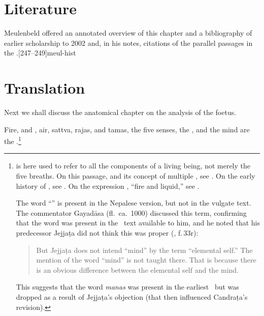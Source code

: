 \section{Literature} 

Meulenbeld offered an annotated overview of this chapter and a
bibliography of earlier scholarship to 2002 and, in his notes, citations
of the parallel passages in the \CS.[247--249]{meul-hist}   

\newpage

\section{Translation}

\begin{translation}

  
\bigskip       

\item[1]

Next we shall discuss the anatomical chapter on the analysis of the foetus.
 
\item[3]

\newenvironment{tightquote}
    {\list{}{\listparindent 1.5em%
          \itemindent    \listparindent
          \rightmargin   \leftmargin
          \parsep        \z@ \@plus\p@}%
      \item\relax}
  {\endlist}

Fire, and , air, sattva, rajas, and tamas, the five
senses, the , and the mind
are the .\footnote{ is here used to 
refer to all the components of a living being, not merely the five breaths.
On this passage, and its concept of multiple , see 
\cite[\S3.2.3]{kleb-2021b}.
On the early history of , see \cite{zysk-1993,zysk-2007}.
On the expression ,  “fire and liquid,” see 
\cite{wuja-2004,ange-2021}.

The word “” is present in the Nepalese version, but not
in the vulgate text.  The commentator Gayadāsa (fl.\ ca.\ 1000)
discussed this term, confirming that the word was present in the \SS\
text available to him, and he noted that his predecessor Jejjaṭa did
not think this was proper (\MS{Cambridge Add.2491}, f.\,33r):
\begin{quote}
\par  But Jejjaṭa does not intend “mind” by
the term “elemental self.”  The mention of the word “mind” is not
taught there. That is because there is an obvious difference between
the elemental self and the mind.
\end{quote}
This suggests that the word \emph{manas} was present in the earliest
\SS\ but was dropped as a result of Jejjaṭa's objection (that then
influenced Candraṭa's revision).}



\end{translation}
